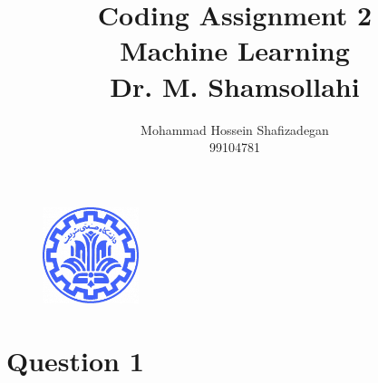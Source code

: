 \documentclass[]{article}
\author{
	Mohammad Hossein Shafizadegan\\
	99104781
}
\title{
	Coding Assignment 2 \\
	Machine Learning  \\
	Dr. M. Shamsollahi
}
\begin{document}
	\begin{figure}
		\includegraphics[width=0.25\textwidth]{Fig/Sharif.png}
		\centering
	\end{figure}
	\maketitle
	\tableofcontents
	\newpage
	\section{Question 1}
\end{document}
